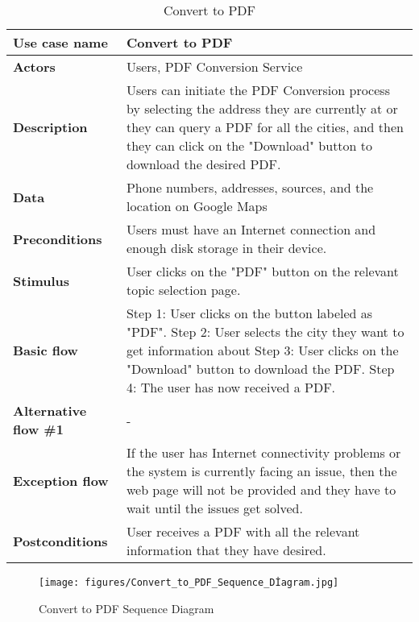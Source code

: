 \documentclass[listof=nochaptergap]{report}
\begin{document}
    \begin{table}[H]
        \centering
         \begin{tabular}{| p{4cm} | p{10cm} |} 
         \hline
         \textbf{Use case name} & Convert to PDF \\
         \hline
         \textbf{Actors} & Users, PDF Conversion Service \\
         \hline
         \textbf{Description} & Users can initiate the PDF Conversion process by selecting the address they are currently at or they can query a PDF for all the cities, and then they can click on the "Download" button to download the desired PDF.  \\
         \hline
         \textbf{Data} & Phone numbers, addresses, sources, and the location on Google Maps \\
         \hline
         \textbf{Preconditions} & Users must have an Internet connection and enough disk storage in their device. \\
         \hline
         \textbf{Stimulus} & User clicks on the "PDF" button on the relevant topic selection page. \\
         \hline
         \textbf{Basic flow} & Step 1: User clicks on the button labeled as "PDF". \newline Step 2: User selects the city they want to get information about \newline Step 3: User clicks on the "Download" button to download the PDF. \newline Step 4: The user has now received a PDF. \\
         \hline
         \textbf{Alternative flow \#1} & - \\
         \hline
         \textbf{Exception flow} & If the user has Internet connectivity problems or the system is currently facing an issue, then the web page will not be provided and they have to wait until the issues get solved. \\
         \hline
         \textbf{Postconditions} & User receives a PDF with all the relevant information that they have desired. \\
         \hline
         \end{tabular}
        \caption{Convert to PDF}
        \label{tab:table17}
    \end{table}

    \begin{center}
            \begin{figure}[H]
                \centering
                \texttt{[image: figures/Convert\_to\_PDF\_Sequence\_Dİagram.jpg]}
                \caption{Convert to PDF Sequence Diagram} 
                \label{fig:figure1}
            \end{figure}
        \end{center}
    
\end{document}
